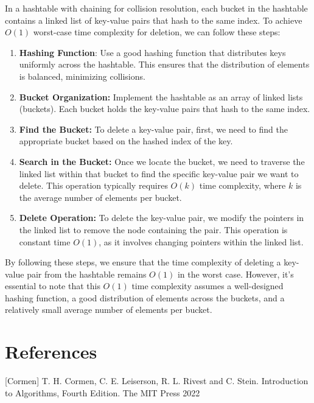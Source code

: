 \documentclass[10pt]{article}
\begin{document}
In a hashtable with chaining for collision resolution, each bucket in the hashtable contains a linked list of key-value pairs that hash to the same index. To achieve $O(1)$ worst-case time complexity for deletion, we can follow these steps:

\begin{enumerate}
  \item \textbf{Hashing Function}: Use a good hashing function that distributes keys uniformly across the hashtable. This ensures that the distribution of elements is balanced, minimizing collisions.

  \item \textbf{Bucket Organization:} Implement the hashtable as an array of linked lists (buckets). Each bucket holds the key-value pairs that hash to the same index.
  
  \item \textbf{Find the Bucket:} To delete a key-value pair, first, we need to find the appropriate bucket based on the hashed index of the key.
  
  \item \textbf{Search in the Bucket:} Once we locate the bucket, we need to traverse the linked list within that bucket to find the specific key-value pair we want to delete. This operation typically requires $O(k)$ time complexity, where $k$ is the average number of elements per bucket.
  
  \item \textbf{Delete Operation:} To delete the key-value pair, we modify the pointers in the linked list to remove the node containing the pair. This operation is constant time $O(1)$, as it involves changing pointers within the linked list.
\end{enumerate}

By following these steps, we ensure that the time complexity of deleting a key-value pair from the hashtable remains $O(1)$ in the worst case. However, it's essential to note that this $O(1)$ time complexity assumes a well-designed hashing function, a good distribution of elements across the buckets, and a relatively small average number of elements per bucket.

\section*{References}
[Cormen] T. H. Cormen, C. E. Leiserson, R. L. Rivest and C. Stein. Introduction to Algorithms, Fourth Edition. The MIT Press 2022
\end{document}
